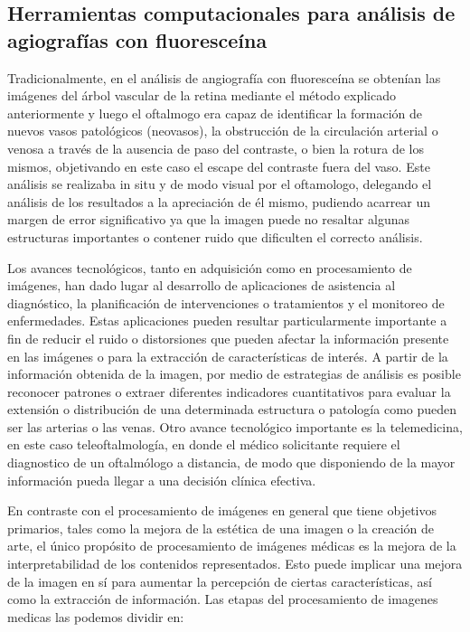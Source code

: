 	\subsection{Herramientas computacionales para an\'alisis de agiograf\'ias con fluoresce\'ina}


Tradicionalmente, en el análisis de  angiografía con fluoresceína  se obtenían las imágenes del árbol vascular de la retina mediante  el método explicado anteriormente y luego  el oftalmogo era capaz de identificar la formación de nuevos vasos patológicos (neovasos), la obstrucción de la circulación arterial o venosa a través de la ausencia de paso del contraste, o bien la rotura de los mismos, objetivando en este caso el escape del contraste fuera del vaso. Este análisis se realizaba in situ y de modo visual por el oftamologo, delegando el análisis de los resultados a la apreciación de él mismo, pudiendo acarrear un margen de error significativo ya que la imagen puede no resaltar algunas estructuras importantes o contener ruido que dificulten el correcto análisis.

Los avances tecnológicos, tanto en adquisición como en procesamiento de imágenes, han dado lugar al desarrollo de aplicaciones de asistencia al diagnóstico, la planificación de intervenciones o tratamientos y el monitoreo de enfermedades. Estas aplicaciones pueden resultar particularmente importante a fin de reducir el ruido o distorsiones que pueden afectar la información presente en las imágenes o para la extracción de características de interés.
A partir de la información obtenida de la imagen, por medio de estrategias de análisis es posible reconocer patrones o extraer diferentes indicadores cuantitativos para evaluar la extensión o distribución de una determinada estructura o patología como pueden ser las arterias o las venas.
Otro avance tecnológico importante es la telemedicina, en este caso teleoftalmología, en donde el  médico solicitante requiere el diagnostico de un oftalmólogo a distancia, de modo que disponiendo de la mayor información pueda llegar a una decisión clínica efectiva.

En contraste con el procesamiento de imágenes en general que tiene objetivos primarios, tales como la mejora de la estética de una imagen o la creación de arte, el único propósito de procesamiento de imágenes médicas es la mejora de la interpretabilidad de los contenidos representados. Esto puede implicar una mejora de la imagen en sí para aumentar la percepción de ciertas características, así como la extracción de información.
Las etapas del procesamiento de imagenes medicas las podemos dividir en:

